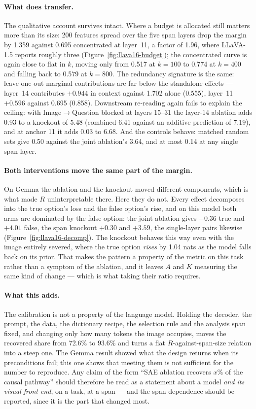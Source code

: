 \documentclass[11pt,a4paper]{article}
\begin{document}
\paragraph{What does transfer.} The qualitative account survives intact. Where a
budget is allocated still matters more than its size: 200 features spread over
the five span layers drop the margin by 1.359 against 0.695 concentrated at
layer~11, a factor of 1.96, where LLaVA-1.5 reports roughly three
(Figure~\ref{fig:llava16-budget}); the concentrated curve is again close to flat
in $k$, moving only from 0.517 at $k = 100$ to 0.774 at $k = 400$ and falling
back to 0.579 at $k = 800$. The redundancy signature is the same: leave-one-out
marginal contributions are far below the standalone effects --- layer~14
contributes $+0.944$ in context against 1.702 alone (0.555), layer~11 $+0.596$
against 0.695 (0.858). Downstream re-reading again fails to explain the ceiling:
with Image$\rightarrow$Question blocked at layers 15--31 the layer-14 ablation
adds 0.93 to a knockout of 5.48 (combined 6.41 against an additive prediction of
7.19), and at anchor 11 it adds 0.03 to 6.68. And the controls behave: matched
random sets give 0.50 against the joint ablation's 3.64, and at most 0.14 at any
single span layer.

\paragraph{Both interventions move the same part of the margin.} On Gemma the
ablation and the knockout moved different components, which is what made $R$
uninterpretable there. Here they do not. Every effect decomposes into the true
option's loss and the false option's rise, and on this model both arms are
dominated by the false option: the joint ablation gives $-0.36$ true and $+4.01$
false, the span knockout $+0.30$ and $+3.59$, the single-layer pairs likewise
(Figure~\ref{fig:llava16-decomp}). The knockout behaves this way even with the
image entirely severed, where the true option \emph{rises} by 1.04 nats as the
model falls back on its prior. That makes the pattern a property of the metric on
this task rather than a symptom of the ablation, and it leaves $A$ and $K$
measuring the same kind of change --- which is what taking their ratio requires.

\paragraph{What this adds.} The calibration is not a property of the language
model. Holding the decoder, the prompt, the data, the dictionary recipe, the
selection rule and the analysis span fixed, and changing only how many tokens the
image occupies, moves the recovered share from 72.6\% to 93.6\% and turns a flat
$R$-against-span-size relation into a steep one. The Gemma result showed what the
design returns when its preconditions fail; this one shows that meeting them is
not sufficient for the number to reproduce. Any claim of the form ``SAE ablation
recovers $x$\% of the causal pathway'' should therefore be read as a statement
about a model \emph{and its visual front-end}, on a task, at a span --- and the
span dependence should be reported, since it is the part that changed most.
\end{document}

